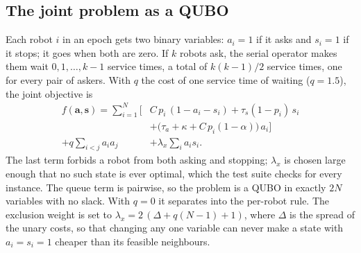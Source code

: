 \documentclass[a4paper,fleqn]{cas-dc}
\begin{document}
\subsection{The joint problem as a QUBO}
\label{sec:qubo}

Each robot $i$ in an epoch gets two binary variables: $a_i = 1$ if it asks and $s_i = 1$ if it stops; it goes when both are zero. If $k$ robots ask, the serial operator makes them wait $0, 1, \dots, k-1$ service times, a total of $k(k-1)/2$ service times, one for every pair of askers. With $q$ the cost of one service time of waiting ($q = 1.5$), the joint objective is
\begin{align}
f(\mathbf{a},\mathbf{s}) = \sum_{i=1}^{N} \Big[ &C\,p_i\,(1-a_i-s_i) + \tau_s(1-p_i)\,s_i \nonumber\\
 &+ \big(\tau_a+\kappa+C\,p_i(1-\alpha)\big)\,a_i \Big] \nonumber\\
 + q \sum_{i<j} a_i a_j &+ \lambda_x \sum_{i} a_i s_i .
\label{eq:qubo}
\end{align}
The last term forbids a robot from both asking and stopping; $\lambda_x$ is chosen large enough that no such state is ever optimal, which the test suite checks for every instance. The queue term is pairwise, so the problem is a QUBO in exactly $2N$ variables with no slack. With $q = 0$ it separates into the per-robot rule. The exclusion weight is set to $\lambda_x = 2\,(\Delta + q(N-1) + 1)$, where $\Delta$ is the spread of the unary costs, so that changing any one variable can never make a state with $a_i = s_i = 1$ cheaper than its feasible neighbours.
\end{document}
